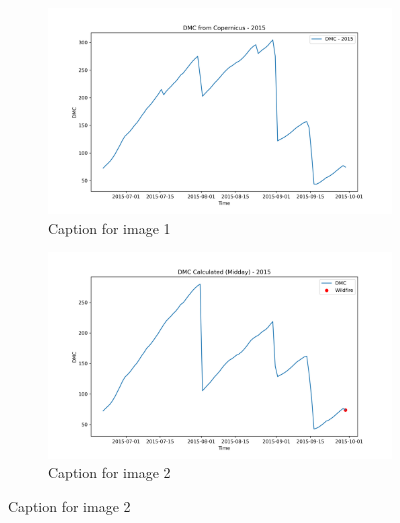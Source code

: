 \begin{figure}[h]
\caption{HELLo}
    \centering
    \begin{subfigure}{0.49\textwidth}
        \centering
        \includegraphics[width=\textwidth]{graphs/2015/2015CopernicusDMC12.png}
        \caption{Caption for image 1}
        \label{fig:img1}
    \end{subfigure}
    \hfill
    \begin{subfigure}{0.49\textwidth}
        \centering
        \includegraphics[width=\textwidth]{graphs/2015/2015CalcDMC12.png}
        \caption{Caption for image 2}
        \label{fig:img2}
    \end{subfigure}
    \label{fig:both_images}
\end{figure}


